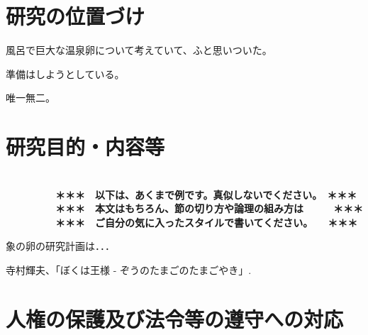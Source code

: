 \documentclass[11pt,a4j,dvipdfmx]{jarticle} 					%
\newcommand{\研究課題名}{象の卵}
\newcommand{\研究機関名}{逢坂大学}
\newcommand{\研究代表者氏名}{湯川秀樹}
\begin{document}

\section{研究の位置づけ}

		風呂で巨大な温泉卵について考えていて、ふと思いついた。

	準備はしようとしている。

	唯一無二。




\section{研究目的・内容等}

\JSPSInstructions	%

\textbf{\\　　　　　＊＊＊　以下は、あくまで例です。真似しないでください。　＊＊＊\\
　　　　　＊＊＊　本文はもちろん、節の切り方や論理の組み方は　　　＊＊＊\\
　　　　　＊＊＊　ご自分の気に入ったスタイルで書いてください。　　＊＊＊}

	象の卵の研究計画は．．．

	\vspace{1cm}
	\begin{thebibliography}{99}
		 寺村輝夫、「ぼくは王様 - ぞうのたまごのたまごやき」.
	\end{thebibliography}



\section{人権の保護及び法令等の遵守への対応}
\end{document}
